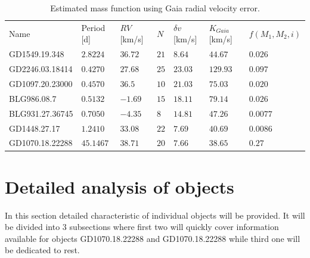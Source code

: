\documentclass{pracalicmgr}
\begin{document}
\begin{table}[H]
    \begin{tabular}{lllllll}
    Name            & Period [d]             & $RV$ [km/s]     & $N$  &  $\delta v$  [km/s]   & $K_{Gaia}$ [km/s]  & $f(M_1,M_2,i)$                   \\
    GD1549.19.348   & $2.8224$   & $36.72$ & $21$ & $8.64$  & $44.67$   & $0.026$ \\
    GD2246.03.18414 & $0.4270$ & $27.68$ & $25$ & $23.03$ & $129.93$ & $0.097$  \\
    GD1097.20.23000 & $0.4570$ & $36.5$  & $10$ & $21.03$ & $75.03$  & $0.020$  \\
    BLG986.08.7     & $0.5132$  & $-1.69$ & $15$ & $18.11$ & $79.14$   & $0.026$  \\
    BLG931.27.36745 & $0.7050$   & $-4.35$ & $8$  & $14.81$ & $47.26$  & $0.0077$ \\
    GD1448.27.17    & $1.2410$  & $33.08$ & $22$ & $7.69$  & $40.69$  & $0.0086$ \\
    GD1070.18.22288 & $45.1467$  & $38.71$ & $20$ & $7.66$  & $38.65$  & $0.27$  \\
    \end{tabular}
    \caption{Estimated mass function using Gaia radial velocity error.}\label{mass_function_table}
    \end{table}

\section{Detailed analysis of objects}
In this section detailed characteristic of individual objects will be provided. It will be divided into $3$ subsections where first two will quickly cover information available for 
objects GD1070.18.22288 and GD1070.18.22288 while third one will be dedicated to rest.
\end{document}
